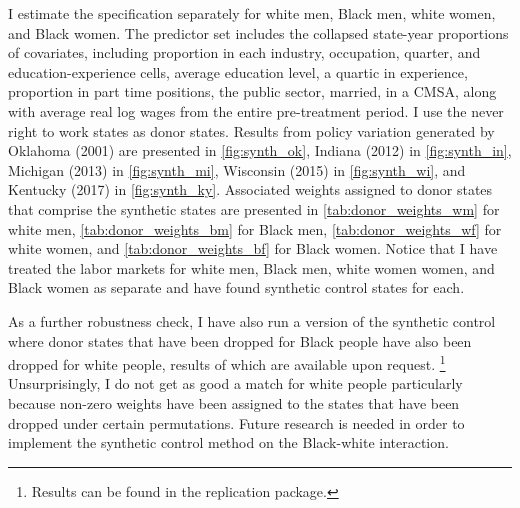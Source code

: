 \documentclass[11pt]{article}
\begin{document}
I estimate the specification separately for white men, Black men, white women, and Black women. The predictor set includes the collapsed state-year proportions of covariates, including proportion in each industry, occupation, quarter, and education-experience cells, average education level, a quartic in experience, proportion in part time positions, the public sector, married, in a CMSA, along with average real log wages from the entire pre-treatment period. I use the never right to work states as donor states. Results from policy variation generated by Oklahoma (2001) are presented in \autoref{fig:synth_ok}, Indiana (2012) in \autoref{fig:synth_in}, Michigan (2013) in \autoref{fig:synth_mi}, Wisconsin (2015) in \autoref{fig:synth_wi}, and Kentucky (2017) in \autoref{fig:synth_ky}. Associated weights assigned to donor states that comprise the synthetic states are presented in \autoref{tab:donor_weights_wm} for white men, \autoref{tab:donor_weights_bm} for Black men, \autoref{tab:donor_weights_wf} for white women, and \autoref{tab:donor_weights_bf} for Black women. Notice that I have treated the labor markets for white men, Black men, white women women, and Black women as separate and have found synthetic control states for each. 

As a further robustness check, I have also run a version of the synthetic control where donor states that have been dropped for Black people have also been dropped for white people, results of which are available upon request. \footnote{Results can be found in the replication package.} Unsurprisingly, I do not get as good a match for white people particularly because non-zero weights have been assigned to the states that have been dropped under certain permutations. Future research is needed in order to implement the synthetic control method on the Black-white interaction. 
\end{document}
